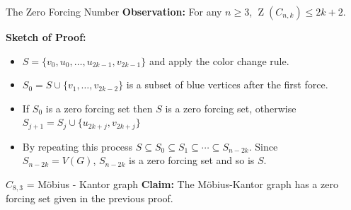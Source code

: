 \documentclass[final]{beamer}
\def\red{\color{red}}
\newcommand{\Z}{\operatorname{Z}}
\begin{document}
\begin{frame}{}
\begin{columns}[t]
\begin{column}{0.38\linewidth}
\end{column}%
    
\begin{column}{0.38 \linewidth}

\begin{block}{\red The Zero Forcing Number}
        {\bf Observation:} For any $ n \geq 3 $, $ \Z(C_{n,k}) \leq 2k + 2 $.
        
\textbf{Sketch of Proof:}
\begin{itemize}
\item $S = \{v_0, u_0, \dots, u_{2k-1}, v_{2k-1}\}$ and apply the color change rule.\\
\item $S_0 = S \cup \{v_1, \dots, v_{2k-2}\}$ is a subset of blue vertices
after the first force.\\
\item If $S_0 $ is a zero forcing set then $S$ is a zero forcing set, otherwise $S_{j+1} = S_j \cup \{u_{2k+j},v_{2k+j}\}$\\
\item By repeating this process $S\subseteq S_0 \subseteq S_1 \subseteq \cdots
\subseteq S_{n-2k}$. Since $S_{n-2k} = V(G)$, $S_{n-2k}$ is a zero forcing set and so is $S$.
\end{itemize}

\end{block}

\begin{block}{$C_{8,3}$ = M\"{o}bius - Kantor graph}
\textbf{Claim:} The M\"{o}bius-Kantor graph has a zero forcing set given in the previous proof.
\begin{figure}[h!]
\centering
{}
\end{figure}


\end{block}
\end{column}
\end{columns}
\end{frame}
\end{document}
